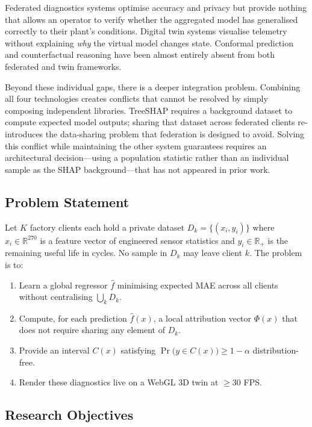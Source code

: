 \documentclass[10pt, journal, letterpaper]{IEEEtran}
\begin{document}
Federated diagnostics systems optimise accuracy and privacy but provide
nothing that allows an operator to verify whether the aggregated model has
generalised correctly to their plant's conditions. Digital twin systems
visualise telemetry without explaining \emph{why} the virtual model changes
state. Conformal prediction and counterfactual reasoning have been almost
entirely absent from both federated and twin frameworks.

Beyond these individual gaps, there is a deeper integration problem. Combining
all four technologies creates conflicts that cannot be resolved by simply
composing independent libraries. TreeSHAP requires a background dataset to
compute expected model outputs; sharing that dataset across federated clients
re-introduces the data-sharing problem that federation is designed to avoid.
Solving this conflict while maintaining the other system guarantees requires
an architectural decision—using a population statistic rather than an
individual sample as the SHAP background—that has not appeared in prior work.

\subsection{Problem Statement}

Let $K$ factory clients each hold a private dataset $D_k = \{(x_i, y_i)\}$
where $x_i \in \mathbb{R}^{270}$ is a feature vector of engineered sensor
statistics and $y_i \in \mathbb{R}_{+}$ is the remaining useful life in
cycles. No sample in $D_k$ may leave client $k$. The problem is to:
\begin{enumerate}
  \item Learn a global regressor $\hat{f}$ minimising expected MAE across
  all clients without centralising $\bigcup_k D_k$.
  \item Compute, for each prediction $\hat{f}(x)$, a local attribution vector
  $\Phi(x)$ that does not require sharing any element of $D_k$.
  \item Provide an interval $C(x)$ satisfying
  $\Pr\!\bigl(y \in C(x)\bigr) \geq 1 - \alpha$ distribution-free.
  \item Render these diagnostics live on a WebGL 3D twin at $\geq 30$ FPS.
\end{enumerate}

\subsection{Research Objectives}
\end{document}
